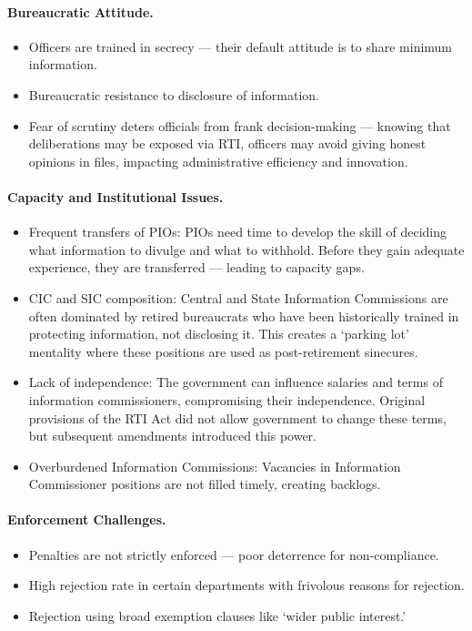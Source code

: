 \paragraph{Bureaucratic Attitude.}
\begin{itemize}
\item Officers are trained in secrecy --- their default attitude is to share minimum information.
\item Bureaucratic resistance to disclosure of information.
\item Fear of scrutiny deters officials from frank decision-making --- knowing that deliberations may be exposed via RTI, officers may avoid giving honest opinions in files, impacting administrative efficiency and innovation.
\end{itemize}

\paragraph{Capacity and Institutional Issues.}
\begin{itemize}
\item Frequent transfers of PIOs: PIOs need time to develop the skill of deciding what information to divulge and what to withhold. Before they gain adequate experience, they are transferred --- leading to capacity gaps.
\item CIC and SIC composition: Central and State Information Commissions are often dominated by retired bureaucrats who have been historically trained in protecting information, not disclosing it. This creates a `parking lot' mentality where these positions are used as post-retirement sinecures.
\item Lack of independence: The government can influence salaries and terms of information commissioners, compromising their independence. Original provisions of the RTI Act did not allow government to change these terms, but subsequent amendments introduced this power.
\item Overburdened Information Commissions: Vacancies in Information Commissioner positions are not filled timely, creating backlogs.
\end{itemize}

\paragraph{Enforcement Challenges.}
\begin{itemize}
\item Penalties are not strictly enforced --- poor deterrence for non-compliance.
\item High rejection rate in certain departments with frivolous reasons for rejection.
\item Rejection using broad exemption clauses like `wider public interest.'
\end{itemize}

